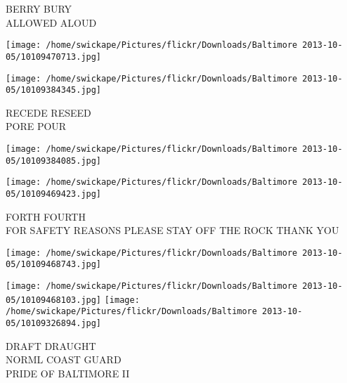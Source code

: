 \documentclass[10pt,letterpaper]{article}
\begin{document}
BERRY BURY\\
ALLOWED ALOUD
\pagebreak

\texttt{[image: /home/swickape/Pictures/flickr/Downloads/Baltimore 2013-10-05/10109470713.jpg]}

\vspace{0.25in}
\texttt{[image: /home/swickape/Pictures/flickr/Downloads/Baltimore 2013-10-05/10109384345.jpg]}

RECEDE RESEED\\
PORE POUR
\pagebreak

\texttt{[image: /home/swickape/Pictures/flickr/Downloads/Baltimore 2013-10-05/10109384085.jpg]}

\vspace{0.25in}
\texttt{[image: /home/swickape/Pictures/flickr/Downloads/Baltimore 2013-10-05/10109469423.jpg]}

FORTH FOURTH\\
FOR SAFETY REASONS PLEASE STAY OFF THE ROCK THANK YOU
\pagebreak

\texttt{[image: /home/swickape/Pictures/flickr/Downloads/Baltimore 2013-10-05/10109468743.jpg]}

\vspace{0.25in}
\texttt{[image: /home/swickape/Pictures/flickr/Downloads/Baltimore 2013-10-05/10109468103.jpg]}
\texttt{[image: /home/swickape/Pictures/flickr/Downloads/Baltimore 2013-10-05/10109326894.jpg]}

DRAFT DRAUGHT\\
NORML COAST GUARD\\
PRIDE OF BALTIMORE II
\pagebreak
\end{document}
